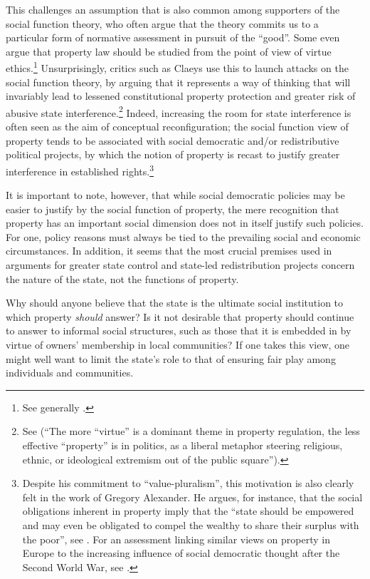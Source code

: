 This challenges an assumption that is also common among supporters of the social function theory, who often argue that the theory commits us to a particular form of normative assessment in pursuit of the ``good''. Some even argue that property law should be studied from the point of view of virtue ethics.\footnote{See generally \cite{penalver09}.} Unsurprisingly, critics such as Claeys use this to launch attacks on the social function theory, by arguing that it represents a way of thinking that will invariably lead to lessened constitutional property protection and greater risk of abusive state interference.\footnote{See \cite{claeys09} (``The more ``virtue'' is a dominant theme in property regulation, the less effective ``property'' is in politics, as a liberal metaphor steering religious, ethnic, or ideological extremism out of the public square'').} Indeed, increasing the room for state interference is often seen as the aim of conceptual reconfiguration; the social function view of property tends to be associated with social democratic and/or redistributive political projects, by which the notion of property is recast to justify greater interference in established rights.\footnote{Despite his commitment to ``value-pluralism'', this motivation is also clearly felt in the work of Gregory Alexander. He argues, for instance, that the social obligations inherent in property imply that the ``state should be empowered and may even be obligated to compel the wealthy to share their surplus with the poor'', see \cite[746]{alexander09}. For an assessment linking similar views on property in Europe to the increasing influence of social democratic thought after the Second World War, see \cite{allen10}.}

It is important to note, however, that while social democratic policies may be easier to justify by  the social function of property, the mere recognition that property has an important social dimension does not in itself justify such policies. For one, policy reasons must always be tied to the prevailing social and economic circumstances. In addition, it seems that the most crucial premises used in arguments for greater state control and state-led redistribution projects concern the nature of the state, not the functions of property.

Why should anyone believe that the state is the ultimate social institution to which property {\it should} answer? Is it not desirable that property should continue to answer to informal social structures, such as those that it is embedded in by virtue of owners' membership in local communities? If one takes this view, one might well want to limit the state's role to that of ensuring fair play among individuals and communities. 

